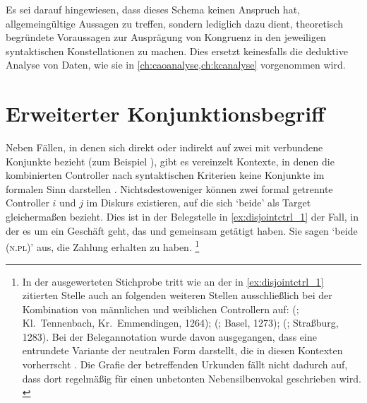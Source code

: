 Es sei darauf hingewiesen, dass dieses Schema keinen Anspruch hat,
allgemeingültige Aussagen zu treffen, sondern lediglich dazu dient, theoretisch
begründete Voraussagen zur Ausprägung von Kongruenz in den jeweiligen
syntaktischen Konstellationen zu machen. Dies ersetzt keinesfalls die deduktive
Analyse von Daten, wie sie in \cref{ch:caoanalyse,ch:kcanalyse} vorgenommen
wird.

\section{Erweiterter Konjunktionsbegriff}
\label{sec:erwkonjbegr}

Neben Fällen, in denen sich  direkt oder indirekt auf zwei mit
 verbundene Konjunkte bezieht (zum Beispiel ), gibt es vereinzelt Kontexte, in denen die
kombinierten Controller nach syntaktischen Kriterien keine Konjunkte im
formalen Sinn darstellen \autocite[vgl.~auch][247--248]{askedal1973}.
Nichtsdestoweniger können zwei formal getrennte Controller $i$ und $j$ im
Diskurs existieren, auf die sich  `beide' als Target
gleichermaßen bezieht. Dies ist in der Belegstelle in \cref{ex:disjointctrl_1}
der Fall, in der es um ein Geschäft geht, das  und 
gemeinsam getätigt haben. Sie sagen  `beide (\textsc{n.pl})' aus, die
Zahlung erhalten zu haben.%
%
	\footnote{In der ausgewerteten Stichprobe tritt  wie an der in
		\cref{ex:disjointctrl_1} zitierten Stelle auch an folgenden weiteren
		Stellen ausschließlich bei der Kombination von männlichen und
		weiblichen Controllern auf: 
		(\cite{cao1}; Kl.~Tennenbach, Kr.~Emmendingen, 1264);
		 (\cite{cao1}; Basel, 1273);
		 (\cite{cao5}; Straßburg, 1283). Bei
		der Belegannotation wurde davon ausgegangen, dass  eine
		entrundete Variante der neutralen Form  darstellt, die in
		diesen Kontexten vorherrscht \autocites(siehe auch
		\cref{sec:caoalemschwa})[vgl.][41]{paul2007}. Die Grafie der
		betreffenden Urkunden fällt nicht dadurch auf, dass dort regelmäßig
		 für einen unbetonten Nebensilbenvokal geschrieben wird.
		\label{fn:caoalemschwa}}


